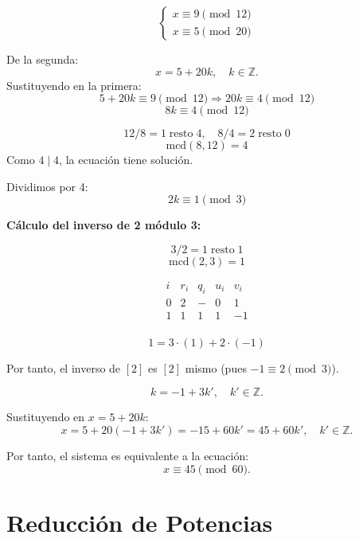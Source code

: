 \documentclass[a4paper,12pt]{article}
\begin{document}
\begin{ejemplo}[title={Ejemplo 3: Sistema con solución}]
\[
\begin{cases}
x \equiv 9 \pmod{12} \\
x \equiv 5 \pmod{20}
\end{cases}
\]

De la segunda:
\[
x = 5 + 20k, \quad k \in \mathbb{Z}.
\]
Sustituyendo en la primera:
\[
5 + 20k \equiv 9 \pmod{12} \Rightarrow 20k \equiv 4 \pmod{12}
\]
\[
8k \equiv 4 \pmod{12}
\]

\[
12 / 8 = 1 \;\text{resto}\; \boxed{4}, \quad 8 / 4 = 2 \;\text{resto}\; 0
\]
\[
\text{mcd}(8,12) = \boxed{4}
\]
Como \(4 \mid 4\), la ecuación tiene solución.

Dividimos por 4:
\[
2k \equiv 1 \pmod{3}
\]

\textbf{Cálculo del inverso de 2 módulo 3:}

\[
3 / 2 = 1 \;\text{resto}\; \boxed{1}
\]
\[
\text{mcd}(2,3) = \boxed{1}
\]

\[
\begin{array}{c|c|c|c|c}
i & r_i & q_i & u_i & v_i \\
\hline
0 & 2 & - & 0 & 1 \\
1 & \boxed{1} & 1 & 1 & -1 \\
\end{array}
\]

\[
\boxed{1} = 3 \cdot (1) + 2 \cdot (-1)
\]

Por tanto, el inverso de \([2]\) es \([2]\) mismo (pues \(-1 \equiv 2 \pmod{3}\)).

\[
k = -1 + 3k', \quad k' \in \mathbb{Z}.
\]

Sustituyendo en \(x = 5 + 20k\):
\[
x = 5 + 20(-1 + 3k') = -15 + 60k' = 45 + 60k', \quad k' \in \mathbb{Z}.
\]

Por tanto, el sistema es equivalente a la ecuación:
\[
x \equiv 45 \pmod{60}.
\]
\end{ejemplo}

\section{Reducción de Potencias}
\end{document}
